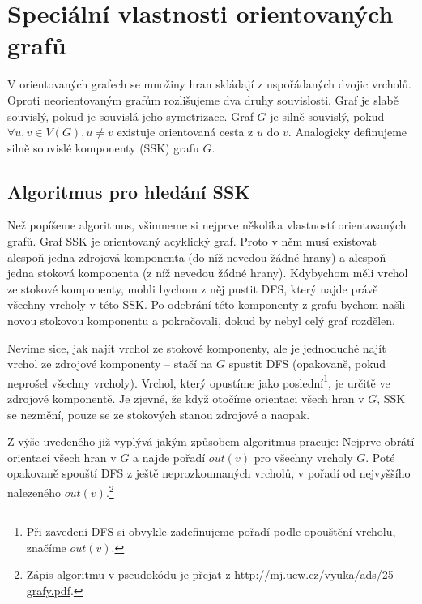 \section{Speciální vlastnosti orientovaných grafů}

\label{silna-souvislost}

V orientovaných grafech se množiny hran skládají z uspořádaných dvojic vrcholů.
Oproti neorientovaným grafům rozlišujeme dva druhy souvislosti. Graf je slabě
souvislý, pokud je souvislá jeho symetrizace. Graf $G$ je silně souvislý, pokud
$\forall u,v \in V(G), u\neq v$ existuje orientovaná cesta z $u$ do $v$.
Analogicky definujeme silně souvislé komponenty (SSK) grafu $G$.

\subsection{Algoritmus pro hledání SSK}

Než popíšeme algoritmus, všimneme si nejprve několika vlastností orientovaných
grafů. Graf SSK je orientovaný acyklický graf. Proto v něm musí existovat
alespoň jedna zdrojová komponenta (do níž nevedou žádné hrany) a alespoň jedna
stoková komponenta (z níž nevedou žádné hrany). Kdybychom měli vrchol ze stokové
komponenty, mohli bychom z něj pustit DFS, který najde právě všechny vrcholy v
této SSK. Po odebrání této komponenty z grafu bychom našli novou stokovou
komponentu a pokračovali, dokud by nebyl celý graf rozdělen.

Nevíme sice, jak najít vrchol ze stokové komponenty, ale je jednoduché najít vrchol ze zdrojové komponenty -- stačí na $G$ spustit DFS (opakovaně, pokud neprošel všechny vrcholy). Vrchol, který opustíme jako poslední\footnote{Při zavedení DFS si obvykle zadefinujeme pořadí podle opouštění vrcholu, značíme $out(v)$.}, je určitě ve zdrojové komponentě. Je zjevné, že když otočíme orientaci všech hran v $G$, SSK se nezmění, pouze se ze stokových stanou zdrojové a naopak.


Z výše uvedeného již vyplývá jakým způsobem algoritmus pracuje: Nejprve obrátí orientaci všech hran v $G$ a najde pořadí $out(v)$ pro všechny vrcholy $G$. Poté opakovaně spouští DFS z ještě neprozkoumaných vrcholů, v pořadí od nejvyššího nalezeného $out(v)$.\footnote{Zápis algoritmu v pseudokódu je přejat z \url{http://mj.ucw.cz/vyuka/ads/25-grafy.pdf}.}

